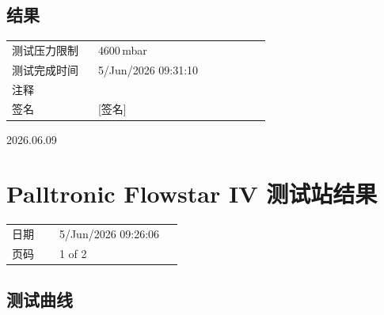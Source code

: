 \documentclass[UTF8,10pt,a4paper,fontset=fandol]{ctexart}
\newcommand{\fieldvalue}[1]{#1}
\newcommand{\handwritten}[1]{#1}
\begin{document}
\vspace{1em}

\subsection{结果}

\begin{tabular}{@{}p{0.30\linewidth}p{0.60\linewidth}@{}}
测试压力限制 &
\fieldvalue{4600\,mbar}
\\[2pt]
测试完成时间 &
\fieldvalue{5/Jun/2026 09:31:10}
\\[2pt]
注释 &
\\[2pt]
签名 &
\fieldvalue{\handwritten{[签名]}}
\end{tabular}

\vspace{1em}

\handwritten{2026.06.09}

\section{Palltronic Flowstar IV 测试站结果}

\begin{tabular}{@{}p{0.25\linewidth}p{0.65\linewidth}@{}}
日期 &
\fieldvalue{5/Jun/2026 09:26:06}
\\[2pt]
页码 &
\fieldvalue{1 of 2}
\end{tabular}

\vspace{1em}

\subsection{测试曲线}

\begin{center}
\setlength{\fboxsep}{6pt}
\end{center}
\end{document}

